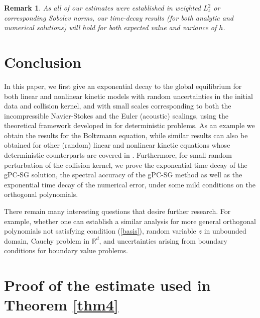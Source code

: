 \documentclass[final,onefignum,onetabnum]{siamart171218}
\newcounter{example}
\newtheorem{remark}[theorem]{Remark}
\begin{document}
\begin{remark}
As all of our estimates were established in weighted $L_z^2$ or corresponding Sobolev norms, 
our time-decay results (for both analytic and numerical solutions) will hold for both expected value and variance of $h$. 
\end{remark}
\section{Conclusion}
\label{conclusion}
In this paper, we first give an exponential decay to the global equilibrium for both linear and nonlinear kinetic models with 
random uncertainties in the initial data and collision kernel, and with small
scales corresponding to both the incompressible Navier-Stokes and the Euler (acoustic)
scalings, using the theoretical framework developed in \cite{CN, MB} for deterministic problems. As an example we obtain the results for the Boltzmann equation, while similar results can also be obtained for other (random) linear and nonlinear kinetic equations whose deterministic counterparts
are covered in \cite{MB}.
Furthermore, for small random perturbation of the collision kernel, 
we prove the exponential time decay of the
gPC-SG solution, the spectral accuracy of the gPC-SG method as well as the exponential time decay of the numerical error, under some mild conditions on the orthogonal polynomials.

There remain many interesting questions that desire further research.
For example, whether one can establish a similar analysis for more general
orthogonal polynomials not satisfying condition (\ref{basis}), random variable
$z$ in unbounded domain, Cauchy problem in $\mathbb R^d$, and uncertainties
arising from boundary conditions for boundary value problems.


\appendix
{}
\section{Proof of the estimate used in Theorem \ref{thm4}}
\end{document}
